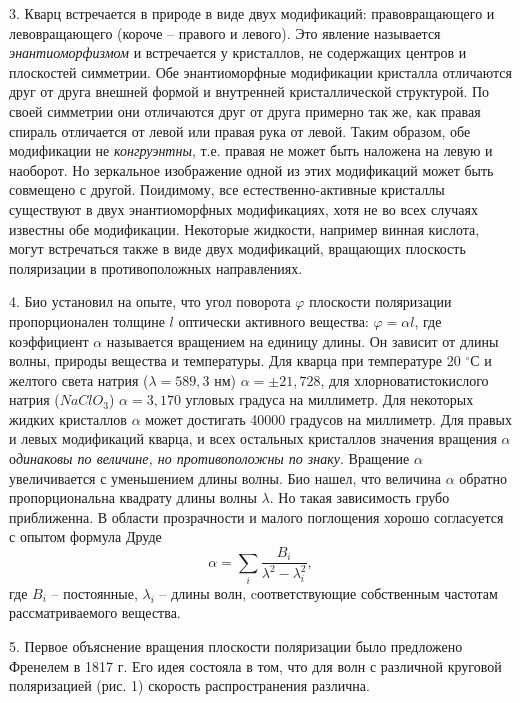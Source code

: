 \documentclass[14pt]{article}
\begin{document}
3. Кварц встречается в природе в виде двух модификаций: правовращающего и левовращающего (короче -- правого и левого). Это явление называется \textsl{энантиоморфизмом} и встречается у кристаллов, не содержащих центров и плоскостей симметрии. Обе энантиоморфные модификации кристалла отличаются друг от друга внешней формой и внутренней кристаллической
структурой. По своей симметрии они отличаются друг от друга примерно так же, как правая спираль отличается от левой или правая рука от левой. Таким образом, обе модификации не \textsl{конгруэнтны}, т.е. правая не может быть наложена на левую и наоборот. Но зеркальное изображение одной из этих модификаций может быть совмещено с другой. Поидимому, все естественно-активные кристаллы существуют в двух энантиоморфных модификациях, хотя не во всех случаях известны обе модификации. Некоторые жидкости, например винная кислота, могут встречаться также в виде двух модификаций, вращающих плоскость поляризации в противоположных направлениях.

4. Био установил на опыте, что угол поворота $\varphi$ плоскости поляризации пропорционален толщине $l$ оптически активного вещества: $\varphi = \alpha l$, где коэффициент 
$\alpha$ называется вращением на единицу длины. Он зависит от длины волны, природы вещества и температуры. Для кварца при температуре 20 $^\circ$С и желтого света натрия 
($\lambda = 589,3$ нм) $\alpha = \pm21,728$, для хлорноватистокислого натрия ($NaClO_3$) $\alpha = 3,170$ угловых градуса на миллиметр. Для некоторых жидких кристаллов 
$\alpha$ может достигать 40000 градусов на миллиметр. Для правых и левых модификаций кварца, и всех остальных кристаллов значения вращения $\alpha$ о\textsl{динаковы по величине, но противоположны по знаку}. Вращение $\alpha$ увеличивается с уменьшением длины волны. Био нашел, что величина $\alpha$ обратно пропорциональна квадрату длины волны 
$\lambda$. Но такая зависимость грубо приближенна. В области прозрачности и малого поглощения хорошо согласуется с опытом формула Друде
$$
	\alpha = \sum_i \frac{B_i}{\lambda^2 - \lambda_i^2},
$$
где $B_i$ -- постоянные, $\lambda_i$ -- длины волн, cоответствующие собственным частотам рассматриваемого вещества. 

5. Первое объяснение вращения плоскости поляризации было предложено Френелем в 1817 г. Его идея состояла в том, что для волн с различной круговой поляризацией (рис. 1) скорость распространения различна.
\end{document}
